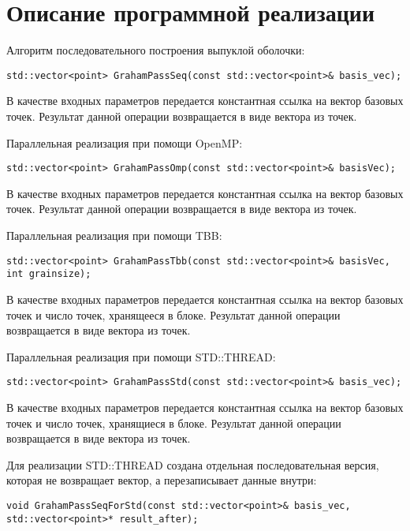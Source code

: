 \documentclass{report}
\begin{document}
\section*{Описание программной реализации}
Алгоритм последовательного построения выпуклой оболочки:
\begin{lstlisting}
std::vector<point> GrahamPassSeq(const std::vector<point>& basis_vec);
\end{lstlisting}
\par В качестве входных параметров передается константная ссылка на вектор базовых точек. Результат данной операции возвращается в виде вектора из точек.
\par Параллельная реализация при помощи OpenMP:
\begin{lstlisting}
std::vector<point> GrahamPassOmp(const std::vector<point>& basisVec);
\end{lstlisting}
\par В качестве входных параметров передается константная ссылка на вектор базовых точек. Результат данной операции возвращается в виде вектора из точек.
\par Параллельная реализация при помощи TBB:
\begin{lstlisting}
std::vector<point> GrahamPassTbb(const std::vector<point>& basisVec, int grainsize);
\end{lstlisting}
\par В качестве входных параметров передается константная ссылка на вектор базовых точек и число точек, хранящееся в блоке. Результат данной операции возвращается в виде вектора из точек.
\par Параллельная реализация при помощи STD::THREAD:
\begin{lstlisting}
std::vector<point> GrahamPassStd(const std::vector<point>& basis_vec);
\end{lstlisting}
\par В качестве входных параметров передается константная ссылка на вектор базовых точек и число точек, хранящиеся в блоке. Результат данной операции возвращается в виде вектора из точек.
\par Для реализации STD::THREAD создана отдельная последовательная версия, которая не возвращает вектор, а перезаписывает данные внутри:
\begin{lstlisting}
void GrahamPassSeqForStd(const std::vector<point>& basis_vec, std::vector<point>* result_after);
\end{lstlisting}
\end{document}

